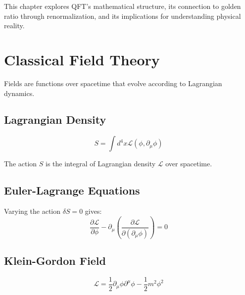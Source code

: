 This chapter explores QFT's mathematical structure, its connection to golden ratio through renormalization, and its implications for understanding physical reality.

\section{Classical Field Theory}

Fields are functions over spacetime that evolve according to Lagrangian dynamics.

\subsection{Lagrangian Density}

\begin{definition}[Lagrangian]
\label{fa_21:def:lagrangian}
\begin{equation}
S = \int d^4x \mathcal{L}(\phi, \partial_\mu\phi)
\end{equation}

The action $S$ is the integral of Lagrangian density $\mathcal{L}$ over spacetime.
\end{definition}

\subsection{Euler-Lagrange Equations}

\begin{theorem}
\label{thm:euler-lagrange}
Varying the action $\delta S = 0$ gives:
\begin{equation}
\frac{\partial\mathcal{L}}{\partial\phi} - \partial_\mu\left(\frac{\partial\mathcal{L}}{\partial(\partial_\mu\phi)}\right) = 0
\end{equation}
\end{theorem}

\subsection{Klein-Gordon Field}

\begin{definition}
\label{fa_21:def:kg}
\begin{equation}
\mathcal{L} = \frac{1}{2}\partial_\mu\phi\partial^\mu\phi - \frac{1}{2}m^2\phi^2
\end{equation}
\end{definition}

